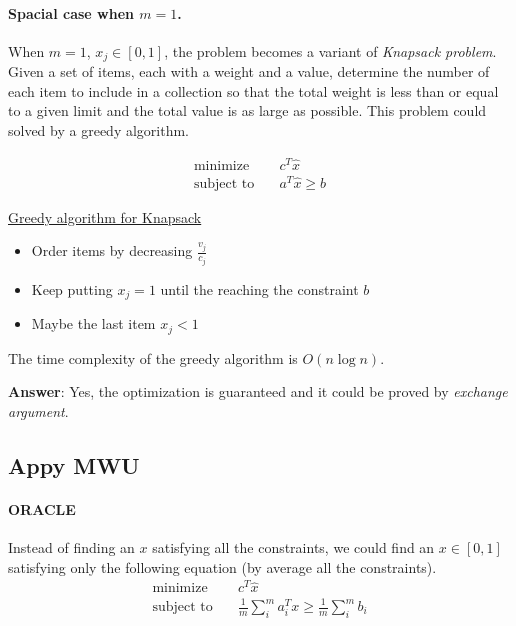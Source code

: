 \documentclass[11pt]{article}
\begin{document}
\smallskip
\paragraph{Spacial case when $m=1$.}
When $m=1$, $x_j\in [0, 1]$, the problem becomes a variant of \emph{Knapsack problem}.
Given a set of items, each with a weight and a value, determine the number of each item to include in a collection so that the total weight is less than or equal to a given limit and the total value is as large as possible.
This problem could solved by a greedy algorithm.

\begin{align*}
\text{minimize} \quad   & c^T\hat{x} \\
\text{subject to} \quad & a^T \hat{x} \geq b
\end{align*}

\begin{mdframed}[backgroundcolor=blue!05,topline=false,bottomline=false,leftline=false,rightline=false] 
    \underline{\sc Greedy algorithm for Knapsack}
    \begin{itemize}
        \item Order items by decreasing $\frac{v_j}{c_j}$
        \item Keep putting $x_j=1$ until the reaching the constraint $b$
        \item Maybe the last item $x_j < 1$
    \end{itemize}
\end{mdframed}

The time complexity of the greedy algorithm is $O(n\log n)$.

\textbf{Answer}: Yes, the optimization is guaranteed and it could be proved by \textit{exchange argument}.
\smallskip

\subsection{Appy MWU}

\paragraph{ORACLE}
Instead of finding an $x$ satisfying all the constraints, we could find an $x \in [0, 1]$ satisfying only the following equation (by average all the constraints).
\begin{align*}
\text{minimize} \quad   & c^T\hat{x} \\
\text{subject to} \quad & \frac{1}{m}\sum_i^m a_i^T x \geq \frac{1}{m}\sum_i^m b_i \\
\end{align*}
\end{document}
